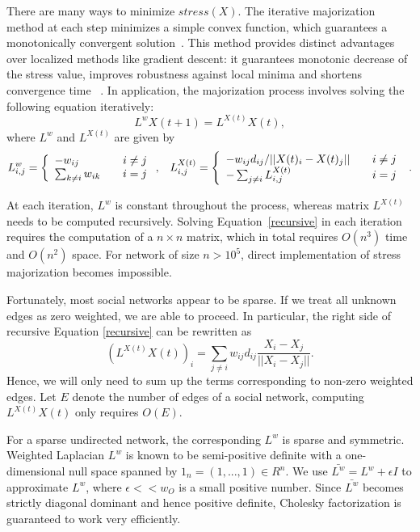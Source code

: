 \documentclass[acmtweb]{acmsmall}
\begin{document}
There are many ways to minimize $stress(X)$. The iterative
majorization method at each step minimizes a simple convex function,
which guarantees a monotonically convergent solution~\cite{Leeuw:77}.
This method provides distinct advantages over localized methods like
gradient descent: it guarantees monotonic decrease of the stress
value, improves robustness against local minima and shortens
convergence time ~\cite{Gansner:05}. In application, the majorization
process involves solving the following equation iteratively:
\begin{equation}\label{recursive}
L^{w}X(t+1)=L^{X(t)}X(t),
\end{equation}
where $L^{w}$ and $L^{X(t)}$ are given by
\[
 L_{i,j}^{w}=\left\{ 
  \begin{array}{l l}
    -w_{ij} \quad & i \neq j\\
    \sum_{k \neq i}w_{ik} \quad &i=j 
  \end{array} \right. \text{,}\quad
  L_{i,j}^{X(t)}=\left\{ 
  \begin{array}{l l}
    -w_{ij}d_{ij}/||X(t)_{i}-X(t)_{j}|| \quad & i \neq j\\
    -\sum_{j \neq i}L_{i,j}^{X(t)} \quad &i=j 
  \end{array} \right. \text{ .}\]

At each iteration, $L^{w}$ is constant throughout the process, whereas
matrix $L^{X(t)}$ needs to be computed recursively. Solving
Equation~\ref{recursive} in each iteration requires the computation of
a $n \times n$ matrix, which in total requires $O(n^3)$ time and
$O(n^{2})$ space. For network of size $n> 10^{5}$, direct
implementation of stress majorization becomes impossible.

Fortunately, most social networks appear to be sparse. If we treat
all unknown edges as zero weighted, we are able to proceed. In
particular, the right side of recursive Equation \ref{recursive} can
be rewritten as
\begin{equation}\label{rightside}
(L^{X(t)}X(t))_{i}= \sum_{j \neq i} w_{ij}d_{ij} \frac {X_{i}-X_{j}}{||X_{i}-X_{j}||} .
\end{equation}
Hence, we will only need to sum up the terms corresponding to non-zero weighted edges. Let $E$ denote the number of edges of a social network, computing $L^{X(t)}X(t)$ only requires $O(E)$. 
 
For a sparse undirected network, the corresponding $L^{w}$ is sparse
and symmetric. Weighted Laplacian $L^{w}$ is known to be semi-positive
definite with a one-dimensional null space spanned by 
$1_{n}=(1,...,1)\in R^{n}$. 
We use $\bar{L^{w}}=L^{w}+ \epsilon I$ to approximate
$L^{w}$, where $\epsilon << w_{O}$ is a small positive number. Since
$\bar{L^{w}}$ becomes strictly diagonal dominant and hence positive
definite, Cholesky factorization is guaranteed to work very
efficiently.
\end{document}

